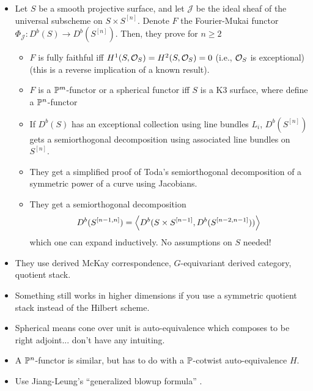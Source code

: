 \documentclass[12pt]{article}
\begin{document}
\begin{itemize}
    \item Let $S$ be a smooth projective surface, and let $\mathcal J$ be the ideal sheaf of the universal subscheme on $S\times S^{[n]}$. Denote $F$ the Fourier-Mukai functor $\Phi_\mathcal J : D^b(S) \to D^b(S^{[n]})$. Then, they prove for $n\geq 2$
    \begin{itemize}
        \item $F$ is fully faithful iff $H^1(S,\cO_S)=H^2(S,\cO_S)=0$ (i.e., $\cO_S$ is exceptional) (this is a reverse implication of a known result).
        \item $F$  is a $\P^m$-functor or a spherical functor iff $S$ is a K3 surface, where {\color{red} define a $\P^n$-functor}
        \item If $D^b(S)$ has an exceptional collection using line bundles $L_i$, $D^b(S^{[n]})$ gets a semiorthogonal decomposition using associated line bundles on $S^{[n]}$.
        \item They get a simplified proof of Toda's semiorthogonal decomposition of a symmetric power of a curve using Jacobians.
        \item They get a semiorthogonal decomposition
        \[D^b(S^{[n-1,n]}) = \<D^b(S\times S^{[n-1]}, D^b(S^{[n-2,n-1]}))\>\]
        which one can expand inductively. No assumptions on $S$ needed!
    \end{itemize}
    \item They use derived McKay correspondence, $G$-equivariant derived category, quotient stack.
    \item Something still works in higher dimensions if you use a symmetric quotient stack instead of the Hilbert scheme.
    \item Spherical means cone over unit is auto-equivalence which composes to be right adjoint... don't have any intuiting.
    \item A $\P^n$-functor is similar, but has to do with a $\P$-cotwist auto-equivalence $H$.
    \item Use Jiang-Leung's ``generalized blowup formula'' \cite{Jiang_Leung_2021}.
\end{itemize}

\cite{Cheng_Perry_Zhao_2025} 
\end{document}
